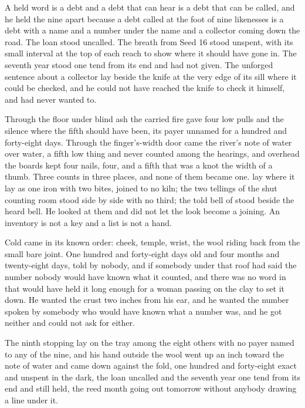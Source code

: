 A held word is a debt and a debt that can hear is a debt that can be called, and he held the nine apart because a debt called at the foot of nine likenesses is a debt with a name and a number under the name and a collector coming down the road. The loan stood uncalled. The breath from Seed 16 stood unspent, with its small interval at the top of each reach to show where it should have gone in. The seventh year stood one tend from its end and had not given. The unforged sentence about a collector lay beside the knife at the very edge of its sill where it could be checked, and he could not have reached the knife to check it himself, and had never wanted to.

Through the floor under blind ash the carried fire gave four low pulls and the silence where the fifth should have been, its payer unnamed for a hundred and forty-eight days. Through the finger's-width door came the river's note of water over water, a fifth low thing and never counted among the hearings, and overhead the boards kept four nails, four, and a fifth that was a knot the width of a thumb. Three counts in three places, and none of them became one.  lay where it lay as one iron with two bites, joined to no kiln; the two tellings of the shut counting room stood side by side with no third; the told bell of  stood beside the heard bell. He looked at them and did not let the look become a joining. An inventory is not a key and a list is not a hand.

Cold came in its known order: cheek, temple, wrist, the wool riding back from the small bare joint. One hundred and forty-eight days old and four months and twenty-eight days, told by nobody, and if somebody under that roof had said the number nobody would have known what it counted, and there was no word in  that would have held it long enough for a woman passing on the clay to set it down. He wanted the crust two inches from his ear, and he wanted the number spoken by somebody who would have known what a number was, and he got neither and could not ask for either.

The ninth stopping lay on the tray among the eight others with no payer named to any of the nine, and his hand outside the wool went up an inch toward the note of water and came down against the fold, one hundred and forty-eight exact and unspent in the dark, the loan uncalled and the seventh year one tend from its end and still held, the reed month going out tomorrow without anybody drawing a line under it.
